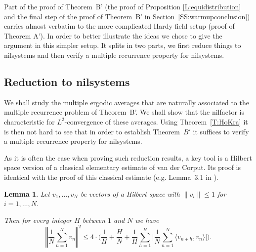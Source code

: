 \documentclass[11pt]{amsart}
\newcommand{\N}{\mathbb{N}}
\newcommand{\norm}[1]{\left\Vert #1\right\Vert}
\theoremstyle{plain}
\newtheorem{lemma}[theorem]{Lemma}
\newtheorem{proposition}[theorem]{Proposition}
\theoremstyle{definition}
\theoremstyle{remark}
\begin{document}
Part of the proof of Theorem~B' (the proof of Proposition
\ref{L:equidistribution} and the final step of the proof of Theorem~B'
in Section~\ref{SS:warmupconclusion}) carries almost verbatim to the
more complicated Hardy field setup (proof of Theorem A'). In order to
better illustrate the ideas we chose to give the argument in this
simpler setup. It splits in two parts, we first reduce things to
nilsystems and then verify a multiple recurrence property for
nilsystems.
\subsection{Reduction to nilsystems}
We shall study the multiple ergodic averages that are naturally
associated to the multiple recurrence problem of Theorem~B'. We shall
show that the nilfactor is characteristic for $L^2$-convergence of
these averages.  Using Theorem~\ref{T:HoKra} it is
then not hard to see that in order to establish Theorem~$B'$ it
suffices to verify a multiple recurrence property for nilsystems.

As it is often the case when proving such reduction results, a key
tool is a Hilbert space
version of a classical elementary estimate of van der Corput. Its proof
is identical with the proof of this classical estimate (e.g. Lemma~3.1 in \cite{KN}).
\begin{lemma} \label{L:VDC} Let $v_1,\ldots, v_N$ be vectors
  of a Hilbert space with $\|v _i\| \leq 1$ for $i=1,\ldots,
  N$.

  Then for every integer  $H$ between $1$ and $N$ we have
$$
\norm{\frac{1}{N}\sum_{n=1}^N v_n}^2\leq 4 \cdot \Big(
\frac{1}{H}+\frac{H}{N}+ \frac{1}{H}\sum_{h=1}^H\Big|\frac{1}{N}
\sum_{n=1}^{N}\langle v_{n+h},v_n\rangle\Big|\Big).
$$
\end{lemma}
\end{document}
